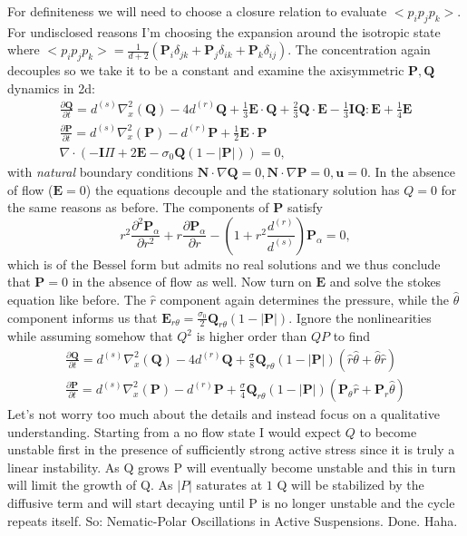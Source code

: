 \documentclass[onecolumn,showpacs,preprintnumbers,prl,amsmath,amssymb]{revtex4-1}
\def\b{\mathbf}
\begin{document}
For definiteness we will need to choose a closure relation to evaluate $<p_ip_jp_k>$.  For undisclosed reasons I'm choosing the expansion around the isotropic state where  $<p_ip_jp_k>=\frac{1}{d+2}\left(\b{P}_i\delta_{jk}+\b{P}_{j}\delta_{ik}+\b{P}_k\delta_{ij}\right)$.  The concentration again decouples so we take it to be a constant and examine the axisymmetric $\b{P,Q}$ dynamics in 2d:
\begin{gather}
\frac{\partial\b{Q}}{\partial t}=d^{(s)}\nabla_x^2(\b{Q})-4d^{(r)}\b{Q}+\frac{1}{3}\b{E\cdot Q}+\frac{2}{3}\b{Q\cdot E}-\frac{1}{3}\b{I Q:E}+\frac{1}{4}\b{E}\\
\nonumber\frac{\partial\b{P}}{\partial t}=d^{(s)}\nabla_x^2(\b{P})-d^{(r)}\b{P}+\frac{1}{2}\b{E\cdot P}\\
\nonumber\nabla\cdot(-\b{I}\Pi+2\b{E}-\sigma_0\b{Q}(1-|\b{P}|))=0,
\end{gather}
with \emph{natural} boundary conditions $\b{N}\cdot\nabla\b{Q}=0,\b{N}\cdot\nabla\b{P}=0,\b{u}=0$.  In the absence of flow ($\b{E}=0$) the equations decouple and the stationary solution has $Q=0$ for the same reasons as before. The components of $\b{P}$ satisfy
\begin{equation}
r^2\frac{\partial^2\b{P}_{\alpha}}{\partial r^2}+r \frac{\partial\b{P}_{\alpha}}{\partial r}-(1+r^2\frac{d^{(r)}}{d^{(s)}})\b{P}_{\alpha}=0,
\end{equation}
which is of the Bessel form but admits no real solutions and we thus conclude that $\b{P}=0$ in the absence of flow as well.  Now turn on $\b{E}$ and solve the stokes equation like before.  The $\hat{r}$ component again determines the pressure, while the $\hat{\theta}$ component informs us that $\b{E}_{r\theta}=\frac{\sigma_0}{2}\b{Q}_{r\theta}(1-|\b{P}|)$.  Ignore the nonlinearities while assuming somehow that $Q^2$ is higher order than $QP$ to find
\begin{gather}
\frac{\partial\b{Q}}{\partial t}=d^{(s)}\nabla_x^2(\b{Q})-4d^{(r)}\b{Q}+\frac{\sigma}{8}\b{Q}_{r\theta}(1-|\b{P}|)(\hat{r}\hat{\theta}+\hat{\theta}\hat{r})\\
\nonumber\frac{\partial\b{P}}{\partial t}=d^{(s)}\nabla_x^2(\b{P})-d^{(r)}\b{P}+\frac{\sigma}{4}\b{Q}_{r\theta}(1-|\b{P}|) (\b{P}_{\theta}\hat{r}+\b{P}_{r}\hat{\theta})
\end{gather}
Let's not worry too much about the details and instead focus on a qualitative understanding.  Starting from a no flow state I would expect $Q$ to become unstable first in the presence of sufficiently strong active stress since it is truly a linear instability.  As Q grows P will eventually become unstable and this in turn will limit the growth of Q.  As $|P|$ saturates at $1$ Q will be stabilized by the diffusive term and will start decaying until P is no longer unstable and the cycle repeats itself.  So: Nematic-Polar Oscillations in Active Suspensions. Done.  Haha.  
\end{document}
